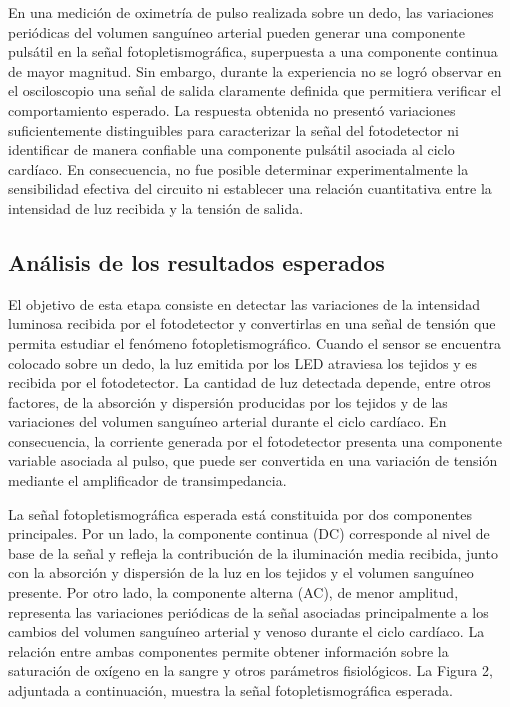 En una medición de oximetría de pulso realizada sobre un dedo, las variaciones periódicas del volumen sanguíneo arterial pueden generar una componente pulsátil en la señal fotopletismográfica, superpuesta a una componente continua de mayor magnitud.
Sin embargo, durante la experiencia no se logró observar en el osciloscopio una señal de salida claramente definida que permitiera verificar el comportamiento esperado. La respuesta obtenida no presentó variaciones suficientemente distinguibles para caracterizar la señal del fotodetector ni identificar de manera confiable una componente pulsátil asociada al ciclo cardíaco. En consecuencia, no fue posible determinar experimentalmente la sensibilidad efectiva del circuito ni establecer una relación cuantitativa entre la intensidad de luz recibida y la tensión de salida.

\subsection{Análisis de los resultados esperados}
El objetivo de esta etapa consiste en detectar las variaciones de la intensidad luminosa recibida por el fotodetector y convertirlas en una señal de tensión que permita estudiar el fenómeno fotopletismográfico.
Cuando el sensor se encuentra colocado sobre un dedo, la luz emitida por los LED atraviesa los tejidos y es recibida por el fotodetector. La cantidad de luz detectada depende, entre otros factores, de la absorción y dispersión producidas por los tejidos y de las variaciones del volumen sanguíneo arterial durante el ciclo cardíaco. En consecuencia, la corriente generada por el fotodetector presenta una componente variable asociada al pulso, que puede ser convertida en una variación de tensión mediante el amplificador de transimpedancia.

La señal fotopletismográfica esperada está constituida por dos componentes principales. Por un lado, la componente continua (DC) corresponde al nivel de base de la señal y refleja la contribución de la iluminación media recibida, junto con la absorción y dispersión de la luz en los tejidos y el volumen sanguíneo presente. Por otro lado, la componente alterna (AC), de menor amplitud, representa las variaciones periódicas de la señal asociadas principalmente a los cambios del volumen sanguíneo arterial y venoso durante el ciclo cardíaco. La relación entre ambas componentes permite obtener información sobre la saturación de oxígeno en la sangre y otros parámetros fisiológicos.
La Figura 2, adjuntada a continuación, muestra la señal fotopletismográfica esperada. 

